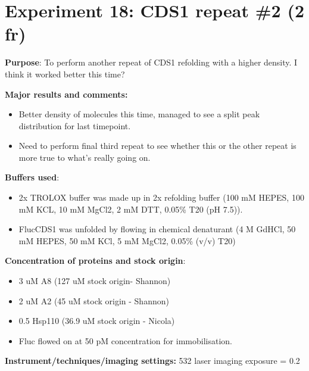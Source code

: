 \documentclass[
  letterpaper,
  DIV=11,
  numbers=noendperiod]{scrartcl}
\author{}
\date{}
\providecommand{\tightlist}{%
  \setlength{\itemsep}{0pt}\setlength{\parskip}{0pt}}\usepackage{longtable,booktabs,array}
\begin{document}
\ifdefined\Shaded\renewenvironment{Shaded}{\begin{tcolorbox}[interior hidden, borderline west={3pt}{0pt}{shadecolor}, sharp corners, boxrule=0pt, breakable, frame hidden, enhanced]}{\end{tcolorbox}}\fi

\hypertarget{experiment-18-cds1-repeat-2-2-fr}{%
\section{Experiment 18: CDS1 repeat \#2 (2
fr)}\label{experiment-18-cds1-repeat-2-2-fr}}

\textbf{Purpose}: To perform another repeat of CDS1 refolding with a
higher density. I think it worked better this time?

\textbf{Major results and comments:}

\begin{itemize}
\tightlist
\item
  Better density of molecules this time, managed to see a split peak
  distribution for last timepoint.
\item
  Need to perform final third repeat to see whether this or the other
  repeat is more true to what's really going on.
\end{itemize}

\textbf{Buffers used}:

\begin{itemize}
\tightlist
\item
  2x TROLOX buffer was made up in 2x refolding buffer (100 mM HEPES, 100
  mM KCL, 10 mM MgCl2, 2 mM DTT, 0.05\% T20 (pH 7.5)).
\item
  FlucCDS1 was unfolded by flowing in chemical denaturant (4 M GdHCl, 50
  mM HEPES, 50 mM KCl, 5 mM MgCl2, 0.05\% (v/v) T20)
\end{itemize}

\textbf{Concentration of proteins and stock origin}:

\begin{itemize}
\tightlist
\item
  3 uM A8 (127 uM stock origin- Shannon)
\item
  2 uM A2 (45 uM stock origin - Shannon)
\item
  0.5 Hsp110 (36.9 uM stock origin - Nicola)
\item
  Fluc flowed on at 50 pM concentration for immobilisation.
\end{itemize}

\textbf{Instrument/techniques/imaging settings:} 532 laser imaging
exposure = 0.2
\end{document}
